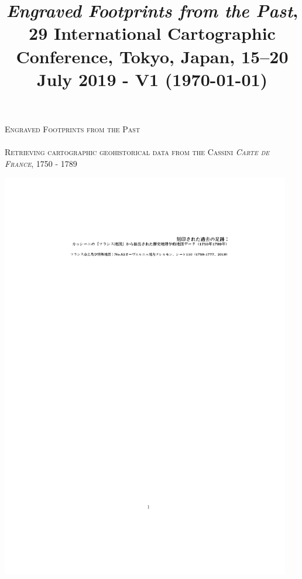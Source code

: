 \documentclass[portrait,a0]{sciposter}
\title{\normalfont \emph{Engraved Footprints from the Past}, 29\up{th} International Cartographic Conference, Tokyo, Japan, 15–20 July 2019 - V1 (\today)}
\institute{EHESS}
\begin{document}
\makeatletter
\conference{\bf \@title}
\makeatother
\bgroup
\setlength{\parindent}{-0.1em} 
\begin{minipage}[t]{0.56\textwidth}
  \Huge
  \textsc{Engraved Footprints from the Past}\\~\\
  \Large \textsc{Retrieving cartographic geohistorical data from the Cassini \textit{Carte de France}, 1750 - 1789}
\end{minipage}
\begin{minipage}[t]{0.43\textwidth}
  \vspace*{-3.2cm}
  \hfill
  \includegraphics[width=0.95\textwidth, trim= 5cm 26cm 4cm 22cm, clip]{gfx/jap.pdf}
\end{minipage}
\egroup
\end{document}
